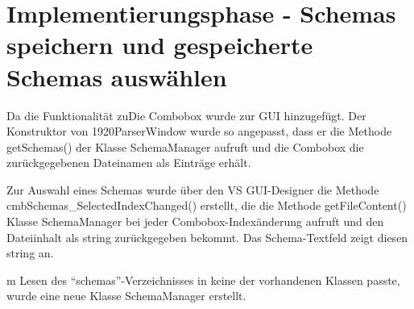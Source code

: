 


\section{Implementierungsphase - Schemas speichern und gespeicherte Schemas auswählen}
\label{sec:Implementierungsphase23e}
Da die Funktionalität zuDie Combobox wurde zur GUI hinzugefügt. Der Konstruktor von 1920ParserWindow wurde so angepasst, dass er die Methode getSchemas() der Klasse SchemaManager aufruft und die Combobox die zurückgegebenen Dateinamen als Einträge erhält.

Zur Auswahl eines Schemas wurde über den \ac{VS} GUI-Designer die Methode cmbSchemas\_SelectedIndexChanged() erstellt, die die Methode getFileContent() Klasse SchemaManager bei jeder Combobox-Indexänderung aufruft und den Dateiinhalt als string zurückgegeben bekommt. Das Schema-Textfeld zeigt diesen string an.

m Lesen des ``schemas''-Verzeichnisses in keine der vorhandenen Klassen passte, wurde eine neue Klasse SchemaManager erstellt.

